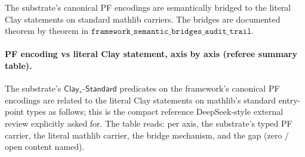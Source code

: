 \documentclass[11pt,a4paper]{amsart}
\theoremstyle{plain}
\theoremstyle{definition}
\begin{document}
The substrate's canonical PF encodings are semantically bridged to the literal Clay statements on standard mathlib carriers. The bridges are documented theorem by theorem in $\texttt{framework\_semantic\_bridges\_audit\_trail}$.

\paragraph{PF encoding vs literal Clay statement, axis by axis (referee summary table).} The substrate's $\textsf{Clay}_{*}\textsf{-Standard}$ predicates on the framework's canonical PF encodings are related to the literal Clay statements on mathlib's standard entry-point types as follows; this is the compact reference DeepSeek-style external review explicitly asked for. The table reads: per axis, the substrate's typed PF carrier, the literal mathlib carrier, the bridge mechanism, and the gap (zero / open content named).
\end{document}

